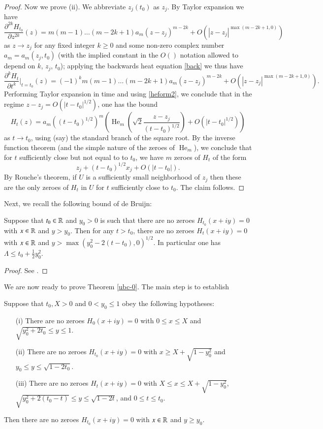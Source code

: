 \begin{proof}
Now we prove (ii).  We abbreviate $z_j(t_0)$ as $z_j$.  By Taylor expansion we have
$$ \frac{\partial^{2k} H_{t_0}}{\partial z^{2k}}(z) = m (m-1) \dots (m-2k+1) a_m (z-z_j)^{m-2k} + O( |z-z_j|^{\max(m-2k+1,0)} )$$
as $z \to z_j$ for any fixed integer $k \geq 0$ and some non-zero complex number $a_m = a_m(z_j, t_0)$ (with the implied constant in the $O()$ notation allowed to depend on $k$, $z_j$, $t_0$); applying the backwards heat equation \eqref{back} we thus have
$$ \frac{\partial^k H_t}{\partial t^k}|_{t=t_0}(z) = (-1)^k m (m-1) \dots (m-2k+1) a_m (z-z_j)^{m-2k} + O( |z-z_j|^{\max(m-2k+1,0)} ).$$
Performing Taylor expansion in time and using \eqref{heform2}, we conclude that in the regime $z - z_j = O( |t-t_0|^{1/2} )$, one has the bound
$$ H_t(z) = a_m ((t-t_0)^{1/2})^m \left( \operatorname{He}_m\left( \sqrt{2} \frac{z-z_j}{(t-t_0)^{1/2}} \right) + O\left( |t-t_0|^{1/2} \right) \right)$$
as $t \to t_0$, using (say) the standard branch of the square root.  By the inverse function theorem (and the simple nature of the zeroes of $\operatorname{He}_m$), we conclude that for $t$ sufficiently close but not equal to to $t_0$, we have $m$ zeroes of $H_t$ of the form
$$ z_j + (t-t_0)^{1/2} x_j + O( |t-t_0| ).$$
By Rouche's theorem, if $U$ is a sufficiently small neighborhood of $z_j$ then these are the only zeroes of $H_t$ in $U$ for $t$ sufficiently close to $t_0$.  The claim follows.
\end{proof}

Next, we recall the following bound of de Bruijn:

\begin{theorem}\label{debr-bound}  Suppose that $t_0 \in \mathbb{R}$ and $y_0 > 0$ is such that there are no zeroes $H_{t_0}(x+iy)=0$ with $x \in \mathbb{R}$ and $y > y_0$.  Then for any $t>t_0$, there are no zeroes $H_{t}(x+iy)=0$ with $x \in \mathbb{R}$ and $y > \max( y_0^2 - 2(t-t_0), 0)^{1/2}$.  In particular one has $\Lambda \leq t_0 + \frac{1}{2} y_0^2$.
\end{theorem}

\begin{proof} See \cite[Theorem 13]{debr}.
\end{proof}

We are now ready to prove Theorem \ref{ubc-0}.  The main step is to establish

\begin{proposition}\label{ubc}  Suppose that $t_0, X > 0$ and $0 < y_0 \leq 1$ obey the following hypotheses:
\begin{itemize}
\item[(i)]  There are no zeroes $H_0(x+iy)=0$ with $0 \leq x \leq X$ and $\sqrt{y_0^2+2 t_0} \leq y \leq 1$.
\item[(ii)]  There are no zeroes $H_{t_0}(x+iy)=0$ with $x \geq X+\sqrt{1-y_0^2}$ and $y_0 \leq y \leq \sqrt{1-2t_0}$.
\item[(iii)]  There are no zeroes $H_{t}(x+iy)=0$ with $X \leq x \leq X+\sqrt{1-y_0^2}$, $\sqrt{y_0^2 + 2(t_0-t)} \leq y \leq \sqrt{1-2t}$, and $0 \leq t \leq t_0$.
\end{itemize}
Then there are no zeroes $H_{t_0}(x+iy) = 0$ with $x \in \mathbb{R}$ and $y \geq y_0$.
\end{proposition}

